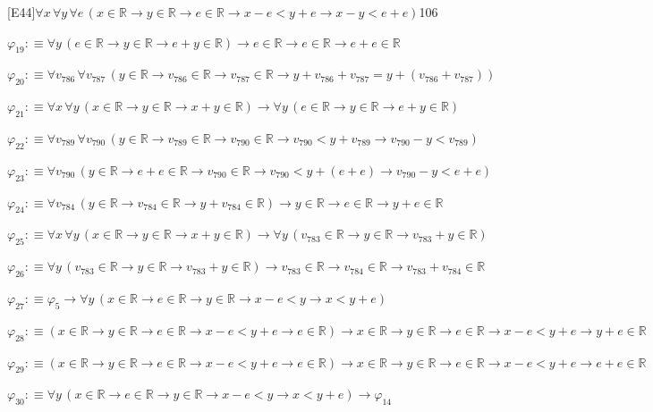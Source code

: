 \begin{fullproof}{[E44]}{$\forall x\,\forall y\,\forall e\,(x \in \mathbb{R} \to y \in \mathbb{R} \to e \in \mathbb{R} \to x - e < y + e \to x - y < e + e)$}{106}
\begin{abbrevlist}
\item $\varphi_{19} :\equiv \forall y\,(e \in \mathbb{R} \to y \in \mathbb{R} \to e + y \in \mathbb{R}) \to e \in \mathbb{R} \to e \in \mathbb{R} \to e + e \in \mathbb{R}$
\item $\varphi_{20} :\equiv \forall v_{786}\,\forall v_{787}\,(y \in \mathbb{R} \to v_{786} \in \mathbb{R} \to v_{787} \in \mathbb{R} \to y + v_{786} + v_{787} = y + (v_{786} + v_{787}))$
\item $\varphi_{21} :\equiv \forall x\,\forall y\,(x \in \mathbb{R} \to y \in \mathbb{R} \to x + y \in \mathbb{R}) \to \forall y\,(e \in \mathbb{R} \to y \in \mathbb{R} \to e + y \in \mathbb{R})$
\item $\varphi_{22} :\equiv \forall v_{789}\,\forall v_{790}\,(y \in \mathbb{R} \to v_{789} \in \mathbb{R} \to v_{790} \in \mathbb{R} \to v_{790} < y + v_{789} \to v_{790} - y < v_{789})$
\item $\varphi_{23} :\equiv \forall v_{790}\,(y \in \mathbb{R} \to e + e \in \mathbb{R} \to v_{790} \in \mathbb{R} \to v_{790} < y + (e + e) \to v_{790} - y < e + e)$
\item $\varphi_{24} :\equiv \forall v_{784}\,(y \in \mathbb{R} \to v_{784} \in \mathbb{R} \to y + v_{784} \in \mathbb{R}) \to y \in \mathbb{R} \to e \in \mathbb{R} \to y + e \in \mathbb{R}$
\item $\varphi_{25} :\equiv \forall x\,\forall y\,(x \in \mathbb{R} \to y \in \mathbb{R} \to x + y \in \mathbb{R}) \to \forall y\,(v_{783} \in \mathbb{R} \to y \in \mathbb{R} \to v_{783} + y \in \mathbb{R})$
\item $\varphi_{26} :\equiv \forall y\,(v_{783} \in \mathbb{R} \to y \in \mathbb{R} \to v_{783} + y \in \mathbb{R}) \to v_{783} \in \mathbb{R} \to v_{784} \in \mathbb{R} \to v_{783} + v_{784} \in \mathbb{R}$
\item $\varphi_{27} :\equiv \varphi_{5} \to \forall y\,(x \in \mathbb{R} \to e \in \mathbb{R} \to y \in \mathbb{R} \to x - e < y \to x < y + e)$
\item $\varphi_{28} :\equiv (x \in \mathbb{R} \to y \in \mathbb{R} \to e \in \mathbb{R} \to x - e < y + e \to e \in \mathbb{R}) \to x \in \mathbb{R} \to y \in \mathbb{R} \to e \in \mathbb{R} \to x - e < y + e \to y + e \in \mathbb{R}$
\item $\varphi_{29} :\equiv (x \in \mathbb{R} \to y \in \mathbb{R} \to e \in \mathbb{R} \to x - e < y + e \to e \in \mathbb{R}) \to x \in \mathbb{R} \to y \in \mathbb{R} \to e \in \mathbb{R} \to x - e < y + e \to e + e \in \mathbb{R}$
\item $\varphi_{30} :\equiv \forall y\,(x \in \mathbb{R} \to e \in \mathbb{R} \to y \in \mathbb{R} \to x - e < y \to x < y + e) \to \varphi_{14}$

\end{abbrevlist}
\end{fullproof}
